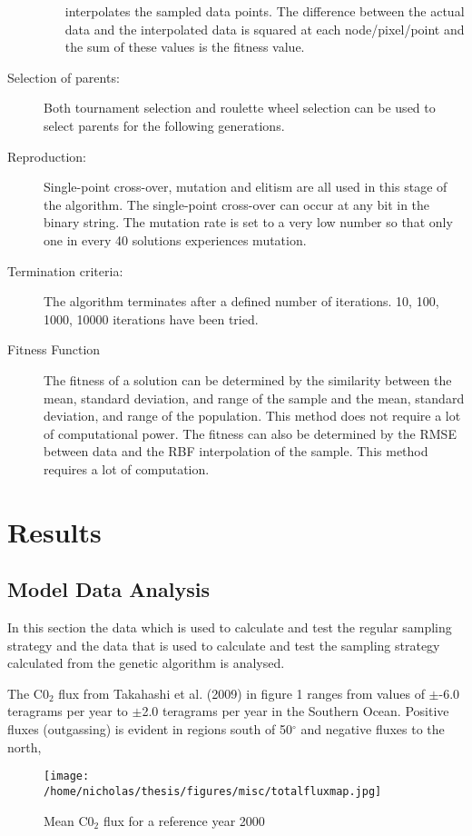 \documentclass[11pt, a4paper]{article}
\numberwithin{figure}{section}
\numberwithin{table}{section}
\begin{document}
\begin{description}
\begin{itemize}
    interpolates the sampled data points. 
	The difference between the actual data and the interpolated data is 
	squared at each node/pixel/point and the sum of these values is the fitness value.
  \end{itemize}
  \item[Selection of parents:] 
	Both tournament selection and roulette wheel selection can be used to 
	select parents for the following generations.
  \item[Reproduction:] 
	Single-point cross-over, mutation and elitism are all used in this stage of the algorithm. 
	The single-point cross-over can occur at any bit in the binary string. 
	The mutation rate is set to a very low number so that only one in 
    every 40 solutions experiences mutation.
  \item[Termination criteria:] 
	The algorithm terminates after a defined number of iterations. 
	10, 100, 1000, 10000 iterations have been tried.
  \item[Fitness Function]
       The fitness of a solution can be determined by the similarity between the mean, standard deviation, and
       range of the sample and the mean, standard deviation, and range of the population. This method does not
       require a lot of computational power.
       The fitness can also be determined by the RMSE between data and the RBF interpolation of the sample. This
       method requires a lot of computation.
       
\end{description}

\newpage
\section{Results}
\subsection{Model Data Analysis}
In this section the data which is used to calculate and test the regular
sampling strategy and the data that is used to calculate and test the
sampling strategy calculated from the genetic algorithm is analysed.

The C0$_2$ flux from Takahashi et al. (2009) in figure 1 ranges from values of $\pm$-6.0 teragrams per year
to $\pm$2.0 teragrams per year in the Southern Ocean.
Positive fluxes (outgassing) is evident in regions south of 50$^{\circ}$ and negative fluxes to the north,
  \begin{figure}[H]
  \caption{Mean C0$_2$ flux for a reference year 2000}
  \centering
  \texttt{[image: /home/nicholas/thesis/figures/misc/totalfluxmap.jpg]}
  \end{figure}
  
\end{document}
